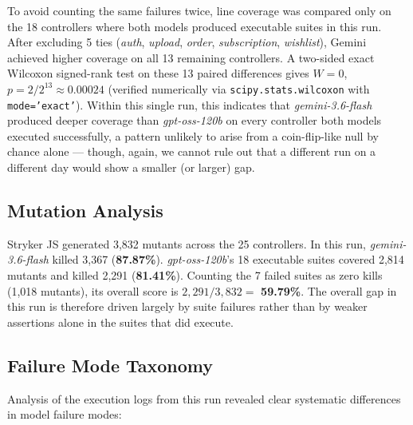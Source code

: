 \documentclass[conference]{IEEEtran}
\begin{document}
To avoid counting the same failures twice, line coverage was compared only on the 18 controllers where both models produced executable suites in this run. After excluding 5 ties (\textit{auth}, \textit{upload}, \textit{order}, \textit{subscription}, \textit{wishlist}), Gemini achieved higher coverage on all 13 remaining controllers. A two-sided exact Wilcoxon signed-rank test on these 13 paired differences gives $W = 0$, $p = 2/2^{13} \approx 0.00024$ (verified numerically via \texttt{scipy.stats.wilcoxon} with \texttt{mode='exact'}). Within this single run, this indicates that \textit{gemini-3.6-flash} produced deeper coverage than \textit{gpt-oss-120b} on every controller both models executed successfully, a pattern unlikely to arise from a coin-flip-like null by chance alone --- though, again, we cannot rule out that a different run on a different day would show a smaller (or larger) gap.

\subsection{Mutation Analysis}

Stryker JS generated 3,832 mutants across the 25 controllers. In this run, \textit{gemini-3.6-flash} killed 3,367 (\textbf{87.87\%}). \textit{gpt-oss-120b}'s 18 executable suites covered 2,814 mutants and killed 2,291 (\textbf{81.41\%}). Counting the 7 failed suites as zero kills (1,018 mutants), its overall score is $2{,}291/3{,}832 =$ \textbf{59.79\%}. The overall gap in this run is therefore driven largely by suite failures rather than by weaker assertions alone in the suites that did execute.

\subsection{Failure Mode Taxonomy}

Analysis of the execution logs from this run revealed clear systematic differences in model failure modes:
\end{document}
